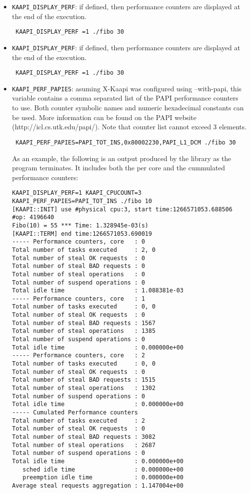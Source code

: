\documentclass{article}
\newcommand{\kaapi}{\textsc{X}-Kaapi\xspace}
\begin{document}
\begin{itemize}
\item \verb+KAAPI_DISPLAY_PERF+: if defined, then performance counters are displayed at the end of the execution.
\begin{verbatim}
 KAAPI_DISPLAY_PERF =1 ./fibo 30
\end{verbatim}

\item \verb+KAAPI_DISPLAY_PERF+: if defined, then performance counters are displayed at the end of the execution.
\begin{verbatim}
 KAAPI_DISPLAY_PERF =1 ./fibo 30
\end{verbatim}

\item \verb+KAAPI_PERF_PAPIES+: asuming \kaapi was configured using --with-papi, this variable contains a comma separated list of the PAPI performance counters to use. Both counter symbolic names and numeric hexadecimal constants can be used. More information can be found on the PAPI website (http://icl.cs.utk.edu/papi/). Note that counter list cannot exceed 3 elements.
\begin{verbatim}
 KAAPI_PERF_PAPIES=PAPI_TOT_INS,0x80002230,PAPI_L1_DCM ./fibo 30
\end{verbatim}

As an example, the following is an output produced by the library as the program terminates. It includes both the per core and the cummulated performance counters:

\begin{verbatim}
KAAPI_DISPLAY_PERF=1 KAAPI_CPUCOUNT=3 KAAPI_PERF_PAPIES=PAPI_TOT_INS ./fibo 10
[KAAPI::INIT] use #physical cpu:3, start time:1266571053.688506
#op: 4196640
Fibo(10) = 55 *** Time: 1.328945e-03(s)
[KAAPI::TERM] end time:1266571053.690019
----- Performance counters, core   : 0
Total number of tasks executed     : 2, 0
Total number of steal OK requests  : 0
Total number of steal BAD requests : 0
Total number of steal operations   : 0
Total number of suspend operations : 0
Total idle time                    : 1.088381e-03
----- Performance counters, core   : 1
Total number of tasks executed     : 0, 0
Total number of steal OK requests  : 0
Total number of steal BAD requests : 1567
Total number of steal operations   : 1385
Total number of suspend operations : 0
Total idle time                    : 0.000000e+00
----- Performance counters, core   : 2
Total number of tasks executed     : 0, 0
Total number of steal OK requests  : 0
Total number of steal BAD requests : 1515
Total number of steal operations   : 1302
Total number of suspend operations : 0
Total idle time                    : 0.000000e+00
----- Cumulated Performance counters
Total number of tasks executed     : 2
Total number of steal OK requests  : 0
Total number of steal BAD requests : 3082
Total number of steal operations   : 2687
Total number of suspend operations : 0
Total idle time                    : 0.000000e+00
   sched idle time                 : 0.000000e+00
   preemption idle time            : 0.000000e+00
Average steal requests aggregation : 1.147004e+00
\end{verbatim}

\end{itemize}
\end{document}
